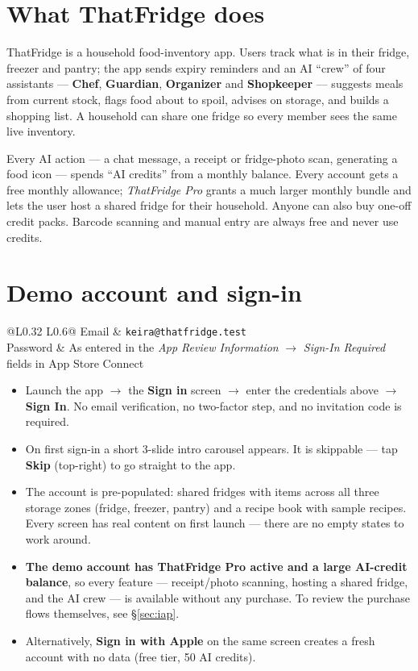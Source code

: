 \documentclass[11pt]{article}
\begin{document}
\section{What ThatFridge does}

ThatFridge is a household food-inventory app. Users track what is in their fridge, freezer
and pantry; the app sends expiry reminders and an AI ``crew'' of four assistants ---
\textbf{Chef}, \textbf{Guardian}, \textbf{Organizer} and \textbf{Shopkeeper} --- suggests
meals from current stock, flags food about to spoil, advises on storage, and builds a
shopping list. A household can share one fridge so every member sees the same live
inventory.

Every AI action --- a chat message, a receipt or fridge-photo scan, generating a food icon
--- spends ``AI credits'' from a monthly balance. Every account gets a free monthly
allowance; \emph{ThatFridge Pro} grants a much larger monthly bundle and lets the user host
a shared fridge for their household. Anyone can also buy one-off credit packs. Barcode
scanning and manual entry are always free and never use credits.

\section{Demo account and sign-in}

\begin{tabular}{@{}L{0.32\linewidth} L{0.6\linewidth}@{}}
\toprule
Email    & \texttt{keira@thatfridge.test} \\
Password & As entered in the \emph{App Review Information} $\rightarrow$ \emph{Sign-In Required}
           fields in App Store Connect \\
\bottomrule
\end{tabular}

\begin{itemize}
  \item Launch the app $\rightarrow$ the \textbf{Sign in} screen $\rightarrow$ enter the
        credentials above $\rightarrow$ \textbf{Sign In}. No email verification, no
        two-factor step, and no invitation code is required.
  \item On first sign-in a short 3-slide intro carousel appears. It is skippable --- tap
        \textbf{Skip} (top-right) to go straight to the app.
  \item The account is pre-populated: shared fridges with items across all three storage
        zones (fridge, freezer, pantry) and a recipe book with sample recipes. Every screen
        has real content on first launch --- there are no empty states to work around.
  \item \textbf{The demo account has ThatFridge Pro active and a large AI-credit balance},
        so every feature --- receipt/photo scanning, hosting a shared fridge, and the AI
        crew --- is available without any purchase. To review the purchase flows themselves,
        see \S\ref{sec:iap}.
  \item Alternatively, \textbf{Sign in with Apple} on the same screen creates a fresh
        account with no data (free tier, 50 AI credits).
\end{itemize}
\end{document}
